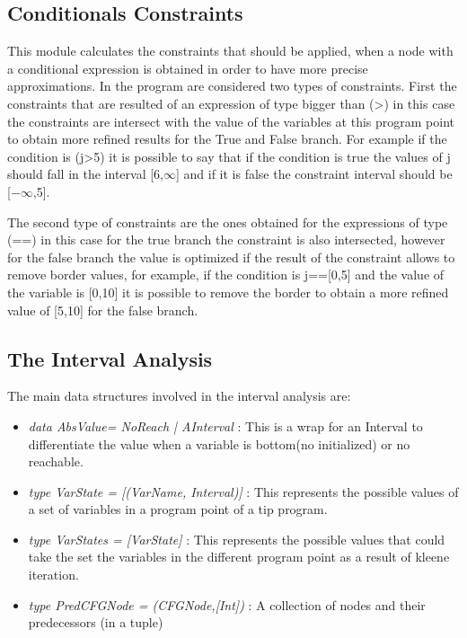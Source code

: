 \documentclass{article}
\begin{document}
\subsection{Conditionals Constraints}
This module calculates the constraints that should be applied, when a node with a conditional 
expression is obtained in order to have more precise approximations. In the program are considered two types of constraints. First the constraints that are resulted of an expression of type bigger than (>) in this case the constraints are intersect with the value of the variables at this program point to obtain more refined results for the True and False branch. For example if the condition is (j>5) it is possible to say that if the condition is true the values of j should fall in the interval [6,$\infty$] and if it is false the constraint interval should be [$-\infty$,5]. 

The second type of constraints are the ones obtained for the expressions of type (==) in this case for the true branch the constraint is also intersected, however for the false branch the value is optimized if the result of the constraint allows to remove border values, for example, if the condition is j==[0,5] and the value of the variable is [0,10]  it is possible to remove the border to obtain a more refined value of [5,10] for the false branch.


\subsection{The Interval Analysis}
The main data structures involved in the interval analysis are:

\begin{itemize}
\item \emph{ data AbsValue= NoReach | AInterval }: This is a wrap for an Interval to differentiate the value when a variable is bottom(no initialized) or no reachable.
  \item \emph{ type VarState = [(VarName, Interval)] }: This represents the possible values of a
    set of variables in a program point of a tip program.
  \item \emph{ type VarStates = [VarState] }: This represents the possible values that could
    take the set the variables in the different program point as a result of kleene
    iteration.
  \item \emph{ type PredCFGNode = (CFGNode,[Int]) }: A collection of nodes and their predecessors (in a tuple)
\end{itemize}
\end{document}
